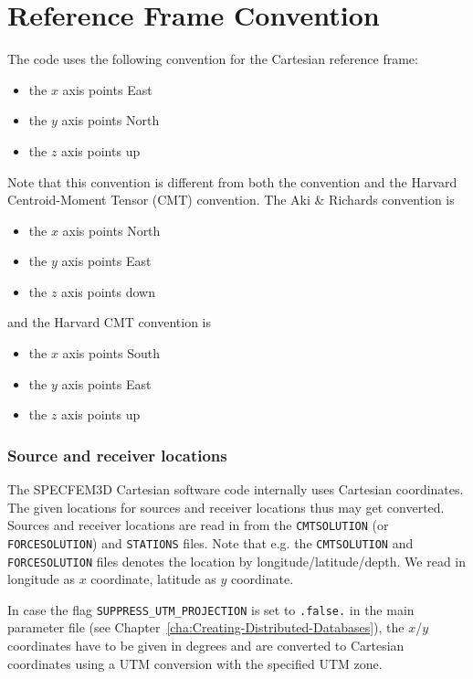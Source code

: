 \chapter{Reference Frame Convention}\label{cha:Coordinates}

The code uses the following convention for the Cartesian reference
frame:
\begin{itemize}
\item the $x$ axis points East
\item the $y$ axis points North
\item the $z$ axis points up
\end{itemize}
Note that this convention is different from both the \citet{AkRi80}
convention and the Harvard Centroid-Moment Tensor (CMT) convention.
The Aki \& Richards convention is
\begin{itemize}
\item the $x$ axis points North
\item the $y$ axis points East
\item the $z$ axis points down
\end{itemize}
and the Harvard CMT convention is
\begin{itemize}
\item the $x$ axis points South
\item the $y$ axis points East
\item the $z$ axis points up
\end{itemize}

\subsection*{Source and receiver locations}

The SPECFEM3D Cartesian software code internally uses Cartesian coordinates.
The given locations for sources and receiver locations thus may get
converted. Sources and receiver locations are read in from the \texttt{CMTSOLUTION}
(or \texttt{FORCESOLUTION}) and \texttt{STATIONS} files. Note that
e.g. the \texttt{CMTSOLUTION} and \texttt{FORCESOLUTION} files denotes
the location by \textquotedbl{}longitude/latitude/depth\textquotedbl{}.
We read in longitude as $x$ coordinate, latitude as $y$ coordinate.

In case the flag \texttt{SUPPRESS\_UTM\_PROJECTION} is set to \texttt{.false.}
in the main parameter file (see Chapter~\ref{cha:Creating-Distributed-Databases}),
the $x$/$y$ coordinates have to be given in degrees and are converted
to Cartesian coordinates using a UTM conversion with the specified
UTM zone.

